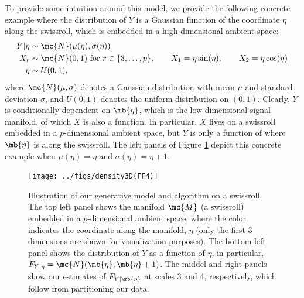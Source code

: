 To provide some intuition around this model, we provide the following concrete example where the distribution of $Y$ is a Gaussian function of the coordinate $\eta$ along the swissroll, which is embedded in a high-dimensional ambient space:
\begin{subequations} \label{eq:linear}
\begin{align}
	Y | \eta &\sim \mc{N}(\mu(\eta) ,\sigma(\eta)) \\
X_r &\sim \mc{N}(0,1) \text{ for } r \in \{3, \ldots, p\}, \qquad 	X_1 = \eta \sin (\eta), \qquad X_2 = \eta \cos (\eta) \\
	\eta  &\sim U(0,1), 
\end{align}
\end{subequations}
where $\mc{N}(\mu,\sigma)$ denotes a Gaussian distribution with mean $\mu$ and standard deviation $\sigma$, and $U(0,1)$ denotes the uniform distribution on $(0,1)$.
Clearly, $Y$ is conditionally dependent on $\mb{\eta}$, which is the low-dimensional signal manifold, of which $X$ is also a function.  In particular, $X$ lives on a swissroll embedded in a $p$-dimensional ambient space, but $Y$ is only a function of where $\mb{\eta}$ is along the swissroll. The left panels of Figure \ref{fig:swiss} depict this concrete example when $\mu(\eta)=\eta$ and $\sigma(\eta)=\eta + 1$.


\begin{figure}[htbp]
	\centering
		\texttt{[image: ../figs/density3D(FF4)]}
	\caption{Illustration of our generative model and algorithm on a swissroll. The top left panel shows the manifold $\mc{M}$ (a swissroll) embedded in a $p$-dimensional ambient space, where the color indicates the coordinate along the manifold, $\eta$ (only the first 3 dimensions are shown for visualization purposes). The bottom left panel shows the distribution of $Y$ as a function of $\eta$, in particular, $F_{Y|\eta}=\mc{N}(\mb{\eta},\mb{\eta}+1)$. The middel and right panels show our estimates of $F_{Y|\mb{\eta}}$ at scales 3 and 4, respectively, which follow from partitioning our data.}
	\label{fig:swiss}
\end{figure}


